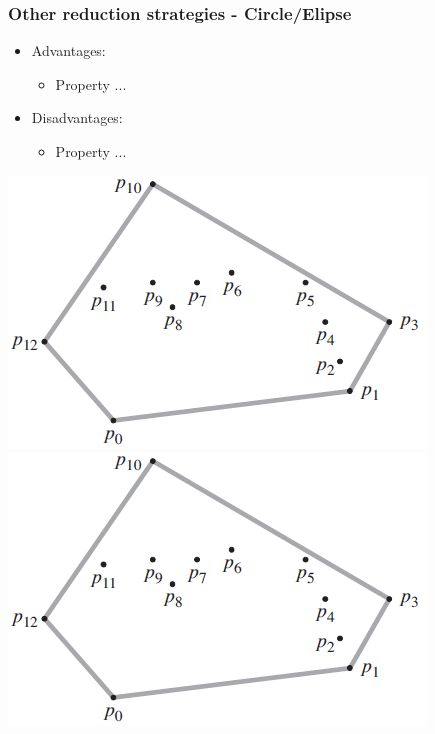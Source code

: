 \begin{frame}
\frametitle{Other reduction strategies - Circle/Elipse}
\begin{multicols}{2}
	\begin{itemize}
		\item Advantages:
		\begin{itemize}
			\item Property ...
		\end{itemize}
		\item Disadvantages:
		\begin{itemize}
			\item Property ...
		\end{itemize}
	\end{itemize}
\columnbreak
	\begin{center}
		\includegraphics[scale=0.5]{graphics/convexHull-example}\\
		\includegraphics[scale=0.5]{graphics/convexHull-example}
	\end{center}
\end{multicols}
\end{frame}	
